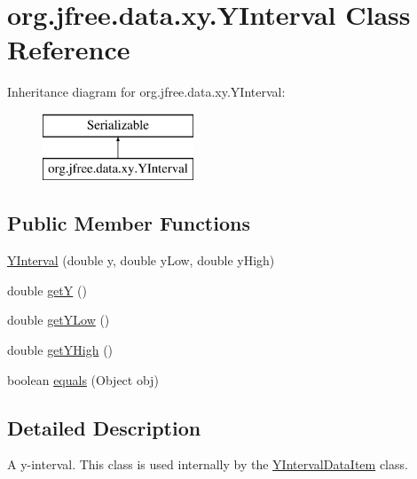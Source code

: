\hypertarget{classorg_1_1jfree_1_1data_1_1xy_1_1_y_interval}{}\section{org.\+jfree.\+data.\+xy.\+Y\+Interval Class Reference}
\label{classorg_1_1jfree_1_1data_1_1xy_1_1_y_interval}
Inheritance diagram for org.\+jfree.\+data.\+xy.\+Y\+Interval\+:\begin{figure}[H]
\begin{center}
\leavevmode
\includegraphics[height=2.000000cm]{classorg_1_1jfree_1_1data_1_1xy_1_1_y_interval}
\end{center}
\end{figure}
\subsection*{Public Member Functions}
\begin{DoxyCompactItemize}
\item 
\mbox{\hyperlink{classorg_1_1jfree_1_1data_1_1xy_1_1_y_interval_a0a52aa159d18e920afb3301960200303}{Y\+Interval}} (double y, double y\+Low, double y\+High)
\item 
double \mbox{\hyperlink{classorg_1_1jfree_1_1data_1_1xy_1_1_y_interval_a355f7f265bb51235846484ae6aedc249}{getY}} ()
\item 
double \mbox{\hyperlink{classorg_1_1jfree_1_1data_1_1xy_1_1_y_interval_ad6039b36ffd92f51f3e1711ece265e11}{get\+Y\+Low}} ()
\item 
double \mbox{\hyperlink{classorg_1_1jfree_1_1data_1_1xy_1_1_y_interval_a4858d09f14f829fce58344cc68e532ef}{get\+Y\+High}} ()
\item 
boolean \mbox{\hyperlink{classorg_1_1jfree_1_1data_1_1xy_1_1_y_interval_a516b48eaed667018594c830d603c9ca3}{equals}} (Object obj)
\end{DoxyCompactItemize}


\subsection{Detailed Description}
A y-\/interval. This class is used internally by the \mbox{\hyperlink{classorg_1_1jfree_1_1data_1_1xy_1_1_y_interval_data_item}{Y\+Interval\+Data\+Item}} class.

